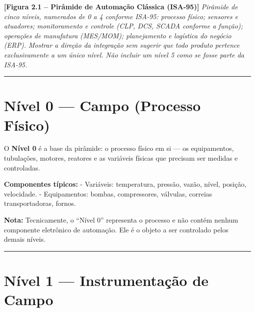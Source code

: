 \begin{caixafigura}

\textbf{{[}Figura 2.1 -- Pirâmide de Automação Clássica (ISA-95){]}}
\emph{Pirâmide de cinco níveis, numerados de 0 a 4 conforme ISA-95: processo físico; sensores e atuadores; monitoramento e controle (CLP, DCS, SCADA conforme a função); operações de manufatura (MES/MOM); planejamento e logística do negócio (ERP). Mostrar a direção da integração sem sugerir que todo produto pertence exclusivamente a um único nível. Não incluir um nível 5 como se fosse parte da ISA-95.}

\end{caixafigura}

\begin{center}\rule{0.5\linewidth}{0.5pt}\end{center}

\section{\texorpdfstring{Nível 0 --- Campo (Processo Físico)}{Nível 0  Campo (Processo Físico)}}\label{nuxedvel-0-campo-processo-fuxedsico}

O \textbf{Nível 0} é a base da pirâmide: o processo físico em si --- os equipamentos, tubulações, motores, reatores e as variáveis físicas que precisam ser medidas e controladas.

\textbf{Componentes típicos:}
- Variáveis: temperatura, pressão, vazão, nível, posição, velocidade.
- Equipamentos: bombas, compressores, válvulas, correias transportadoras, fornos.

\begin{caixanota}

\textbf{Nota:} Tecnicamente, o ``Nível 0'' representa o processo e não contém nenhum componente eletrônico de automação. Ele é o objeto a ser controlado pelos demais níveis.

\end{caixanota}

\begin{center}\rule{0.5\linewidth}{0.5pt}\end{center}

\section{\texorpdfstring{Nível 1 --- Instrumentação de Campo}{Nível 1  Instrumentação de Campo}}\label{nuxedvel-1-instrumentauxe7uxe3o-de-campo}


